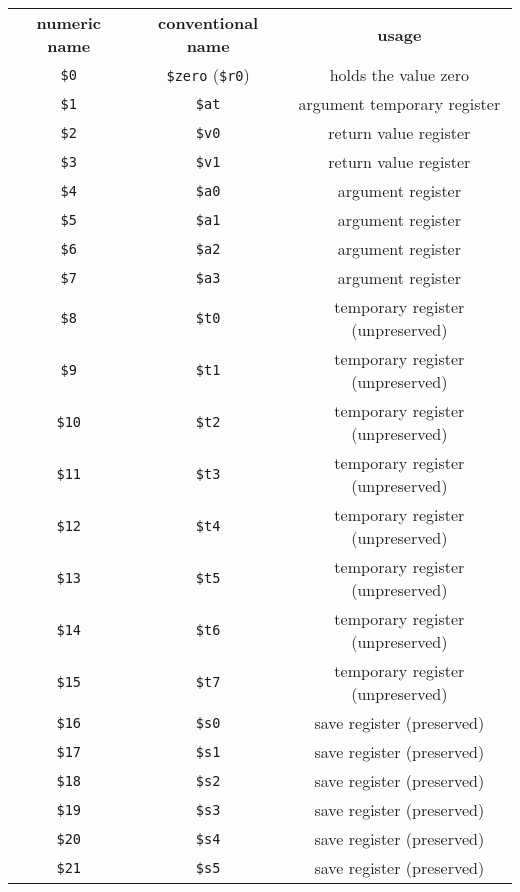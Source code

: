 \documentclass[12pt]{article}
\begin{document}
\begin{tabular}{c | c | c}
    \textbf{numeric name} & \textbf{conventional name} & \textbf{usage}\\
    \hhline{=|=|=}
    \texttt{\$0} & \texttt{\$zero} (\texttt{\$r0}) & holds the value zero \\ \hline
    \texttt{\$1} & \texttt{\$at} & argument temporary register \\ \hline
    \texttt{\$2} & \texttt{\$v0} & return value register \\ \hline
    \texttt{\$3} & \texttt{\$v1} & return value register \\ \hline
    \texttt{\$4} & \texttt{\$a0} & argument register \\ \hline
    \texttt{\$5} & \texttt{\$a1} & argument register \\ \hline
    \texttt{\$6} & \texttt{\$a2} & argument register \\ \hline
    \texttt{\$7} & \texttt{\$a3} & argument register \\ \hline
    \texttt{\$8} & \texttt{\$t0} & temporary register (unpreserved) \\ \hline
    \texttt{\$9} & \texttt{\$t1} & temporary register (unpreserved) \\ \hline
    \texttt{\$10} & \texttt{\$t2} & temporary register (unpreserved) \\ \hline
    \texttt{\$11} & \texttt{\$t3} & temporary register (unpreserved) \\ \hline
    \texttt{\$12} & \texttt{\$t4} & temporary register (unpreserved) \\ \hline
    \texttt{\$13} & \texttt{\$t5} & temporary register (unpreserved) \\ \hline
    \texttt{\$14} & \texttt{\$t6} & temporary register (unpreserved) \\ \hline
    \texttt{\$15} & \texttt{\$t7} & temporary register (unpreserved) \\ \hline
    \texttt{\$16} & \texttt{\$s0} & save register (preserved) \\ \hline
    \texttt{\$17} & \texttt{\$s1} & save register (preserved) \\ \hline
    \texttt{\$18} & \texttt{\$s2} & save register (preserved) \\ \hline
    \texttt{\$19} & \texttt{\$s3} & save register (preserved) \\ \hline
    \texttt{\$20} & \texttt{\$s4} & save register (preserved) \\ \hline
    \texttt{\$21} & \texttt{\$s5} & save register (preserved) \\ \hline

\end{tabular}
\end{document}
